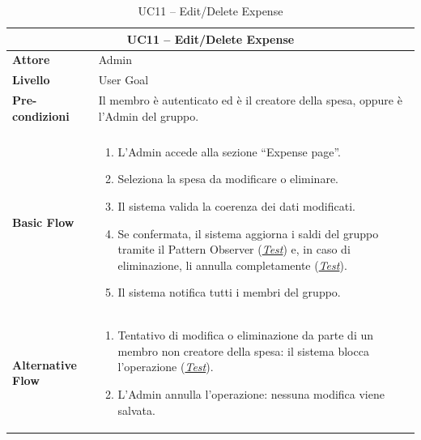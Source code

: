 \begin{table}[htbp]
    \centering
    \footnotesize
    \begin{tabularx}{\textwidth}{|l|X|}
        \hline
        \multicolumn{2}{|c|}{\textbf{UC11 -- Edit/Delete Expense}} \\
        \hline
        \textbf{Attore} & Admin \\
        \hline
        \textbf{Livello} & User Goal \\
        \hline
        \textbf{Pre-condizioni} & Il membro è autenticato ed è il creatore della spesa, oppure è l'Admin del gruppo. \\ \\
        \hline
        \textbf{Basic Flow} & 
        \begin{enumerate}[leftmargin=*, nosep, topsep=3pt]
            \item L'Admin accede alla sezione ``Expense page''.
            \item Seleziona la spesa da modificare o eliminare.
            \item Il sistema valida la coerenza dei dati modificati.
            \item Se confermata, il sistema aggiorna i saldi del gruppo tramite il Pattern Observer (\hyperref[test:uc11_edit]{\textit{Test}}) e, in caso di eliminazione, li annulla completamente (\hyperref[test:uc11_delete]{\textit{Test}}).
            \item Il sistema notifica tutti i membri del gruppo.
        \end{enumerate} \\
        \hline
        \textbf{Alternative Flow} & 
        \begin{enumerate}[label=2\alph*., leftmargin=*, nosep, topsep=3pt]
            \item Tentativo di modifica o eliminazione da parte di un membro non creatore della spesa: il sistema blocca l'operazione (\hyperref[test:uc11_unauthorized]{\textit{Test}}).
            \item L'Admin annulla l'operazione: nessuna modifica viene salvata.
        \end{enumerate} \\
        \hline
    \end{tabularx}
    \caption{UC11 -- Edit/Delete Expense}
    \label{tab:uc11}
\end{table}

